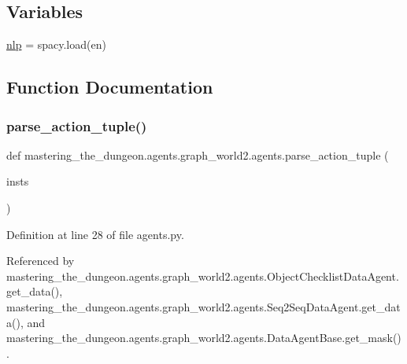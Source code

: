 \subsection*{Variables}
\begin{DoxyCompactItemize}
\item 
\hyperlink{namespacemastering__the__dungeon_1_1agents_1_1graph__world2_1_1agents_a676154c830f968d349009076c7dd466a}{nlp} = spacy.\+load(\textquotesingle{}en\textquotesingle{})
\end{DoxyCompactItemize}


\subsection{Function Documentation}
\mbox{\label{namespacemastering__the__dungeon_1_1agents_1_1graph__world2_1_1agents_ad9e3cbf482daba14ab6d0a026fb0ba24}} 
\subsubsection{\texorpdfstring{parse\+\_\+action\+\_\+tuple()}{parse\_action\_tuple()}}
{\footnotesize\ttfamily def mastering\+\_\+the\+\_\+dungeon.\+agents.\+graph\+\_\+world2.\+agents.\+parse\+\_\+action\+\_\+tuple (\begin{DoxyParamCaption}\item[{}]{insts }\end{DoxyParamCaption})}



Definition at line 28 of file agents.\+py.



Referenced by mastering\+\_\+the\+\_\+dungeon.\+agents.\+graph\+\_\+world2.\+agents.\+Object\+Checklist\+Data\+Agent.\+get\+\_\+data(), mastering\+\_\+the\+\_\+dungeon.\+agents.\+graph\+\_\+world2.\+agents.\+Seq2\+Seq\+Data\+Agent.\+get\+\_\+data(), and mastering\+\_\+the\+\_\+dungeon.\+agents.\+graph\+\_\+world2.\+agents.\+Data\+Agent\+Base.\+get\+\_\+mask().

